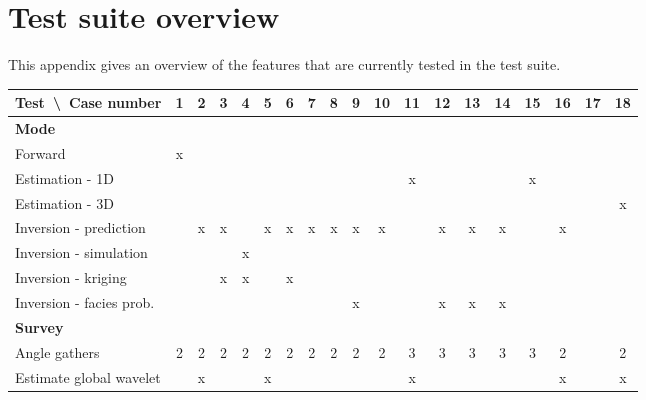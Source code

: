 \chapter{Test suite overview}
\label{sec:test-suite-overview}

This appendix gives an overview of the features that are currently
tested in the test suite. 

\newcommand{\mc}[1]{\multicolumn{19}{|l|}{\textbf{#1}}}



\small
\begin{tabular}{|l|c|c|c|c|c|c|c|c|c|c|c|c|c|c|c|c|c|c|}\hline
Test\ \textbackslash\ Case number    & 1 & 2 & 3 & 4 & 5 & 6 & 7 & 8 & 9 &10 &11 &12 &13 &14 &15 &16 &17 &18 \\ \hline
\mc{Mode}\\ \hline
\quad Forward                        & x &   &   &   &   &   &   &   &   &   &   &   &   &   &   &   &   &   \\ \hline
\quad Estimation - 1D                &   &   &   &   &   &   &   &   &   &   & x &   &   &   & x &   &   &   \\ \hline
\quad Estimation - 3D                &   &   &   &   &   &   &   &   &   &   &   &   &   &   &   &   &   & x \\ \hline
\quad Inversion - prediction         &   & x & x &   & x & x & x & x & x & x &   & x & x & x &   & x &   &   \\ \hline
\quad Inversion - simulation         &   &   &   & x &   &   &   &   &   &   &   &   &   &   &   &   &   &   \\ \hline
\quad Inversion - kriging            &   &   & x & x &   & x &   &   &   &   &   &   &   &   &   &   &   &   \\ \hline
\quad Inversion - facies prob.       &   &   &   &   &   &   &   &   & x &   &   & x & x & x &   &   &   &   \\ \hline
\mc{Survey}\\ \hline
\quad Angle gathers                  & 2 & 2 & 2 & 2 & 2 & 2 & 2 & 2 & 2 & 2 & 3 & 3 & 3 & 3 & 3 & 2 &   & 2 \\ \hline
\quad Estimate global wavelet        &   & x &   &   & x &   &   &   &   &   & x &   &   &   &   & x &   & x \\ \hline

\end{tabular}
